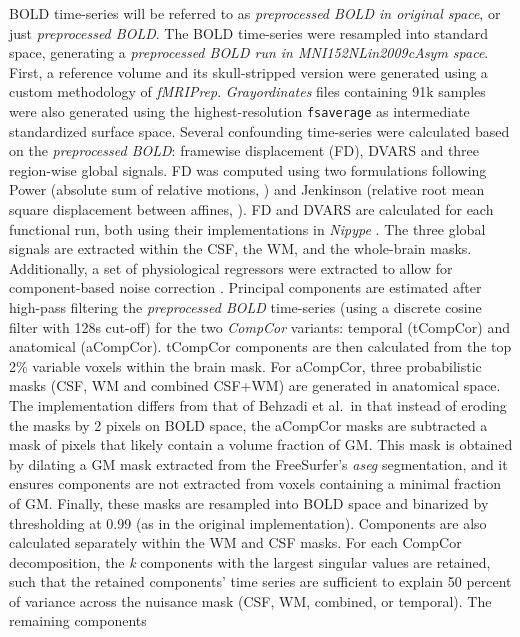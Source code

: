 \documentclass[]{article}
\begin{document}
\begin{description}
BOLD time-series will be referred to as \emph{preprocessed BOLD in
original space}, or just \emph{preprocessed BOLD}. The BOLD time-series
were resampled into standard space, generating a \emph{preprocessed BOLD
run in MNI152NLin2009cAsym space}. First, a reference volume and its
skull-stripped version were generated using a custom methodology of
\emph{fMRIPrep}. \emph{Grayordinates} files \citep{hcppipelines}
containing 91k samples were also generated using the highest-resolution
\texttt{fsaverage} as intermediate standardized surface space. Several
confounding time-series were calculated based on the \emph{preprocessed
BOLD}: framewise displacement (FD), DVARS and three region-wise global
signals. FD was computed using two formulations following Power
(absolute sum of relative motions, \citet{power_fd_dvars}) and Jenkinson
(relative root mean square displacement between affines,
\citet{mcflirt}). FD and DVARS are calculated for each functional run,
both using their implementations in \emph{Nipype} \citep[following the
definitions by][]{power_fd_dvars}. The three global signals are
extracted within the CSF, the WM, and the whole-brain masks.
Additionally, a set of physiological regressors were extracted to allow
for component-based noise correction \citep[\emph{CompCor},][]{compcor}.
Principal components are estimated after high-pass filtering the
\emph{preprocessed BOLD} time-series (using a discrete cosine filter
with 128s cut-off) for the two \emph{CompCor} variants: temporal
(tCompCor) and anatomical (aCompCor). tCompCor components are then
calculated from the top 2\% variable voxels within the brain mask. For
aCompCor, three probabilistic masks (CSF, WM and combined CSF+WM) are
generated in anatomical space. The implementation differs from that of
Behzadi et al.~in that instead of eroding the masks by 2 pixels on BOLD
space, the aCompCor masks are subtracted a mask of pixels that likely
contain a volume fraction of GM. This mask is obtained by dilating a GM
mask extracted from the FreeSurfer's \emph{aseg} segmentation, and it
ensures components are not extracted from voxels containing a minimal
fraction of GM. Finally, these masks are resampled into BOLD space and
binarized by thresholding at 0.99 (as in the original implementation).
Components are also calculated separately within the WM and CSF masks.
For each CompCor decomposition, the \emph{k} components with the largest
singular values are retained, such that the retained components' time
series are sufficient to explain 50 percent of variance across the
nuisance mask (CSF, WM, combined, or temporal). The remaining components

\end{description}
\end{document}
